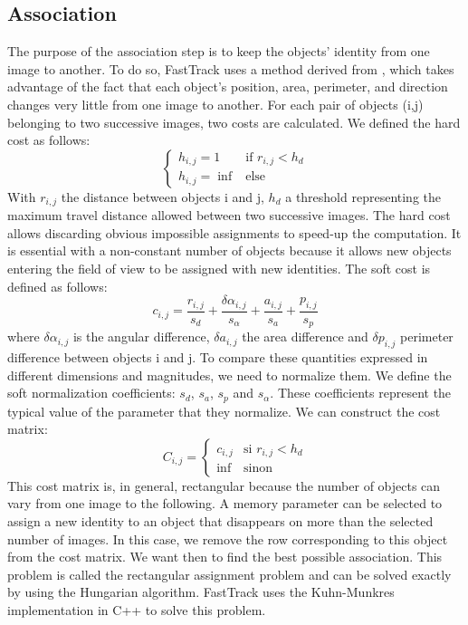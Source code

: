 		\subsection{Association}
		The purpose of the association step is to keep the objects' identity from one image to another. To do so, FastTrack uses a method derived from \cite{}, which takes advantage of the fact that each object's position, area, perimeter, and direction changes very little from one image to another.
		For each pair of objects (i,j) belonging to two successive images, two costs are calculated.
		We defined the hard cost as follows:
        $$
        \left\{
        	\begin{array}{ll}
        		h_{i,j} = 1 & \mbox{if } r_{i,j} < h_{d} \\
        		h_{i,j} = \inf & \mbox{else }
        	\end{array}
        \right.
        $$
        With $r_{i,j}$ the distance between objects i and j, $h_{d}$ a threshold representing the maximum travel distance allowed between two successive images. The hard cost allows discarding obvious impossible assignments to speed-up the computation. It is essential with a non-constant number of objects because it allows new objects entering the field of view to be assigned with new identities.
		The soft cost is defined as follows:
		$$
        c_{i,j} = \frac{r_{i,j}}{s_d} + \frac{\delta\alpha_{i,j}}{s_{\alpha}} + \frac{a_{i,j}}{s_a} + \frac{p_{i,j}}{s_p}
		$$
		where $\delta\alpha_{i,j}$ is the angular difference, $\delta a_{i,j}$ the area difference and $\delta p_{i,j}$ perimeter difference between objects i and j. To compare these quantities expressed in different dimensions and magnitudes, we need to normalize them. We define the soft normalization coefficients: $s_{d}$, $s_{a}$, $s_{p}$ and $s_{\alpha}$. These coefficients represent the typical value of the parameter that they normalize.
        We can construct the cost matrix:
		$$
        C_{i,j} = \left\{
        	\begin{array}{ll}
        		c_{i,j} & \mbox{si } r_{i,j} < h_{d} \\
        		\inf & \mbox{sinon }
        	\end{array}
        \right.
        $$
        This cost matrix is, in general, rectangular because the number of objects can vary from one image to the following. A memory parameter can be selected to assign a new identity to an object that disappears on more than the selected number of images. In this case, we remove the row corresponding to this object from the cost matrix.
		We want then to find the best possible association. This problem is called the rectangular assignment problem and can be solved exactly by using the Hungarian algorithm. FastTrack uses the Kuhn-Munkres implementation in C++ to solve this problem.

